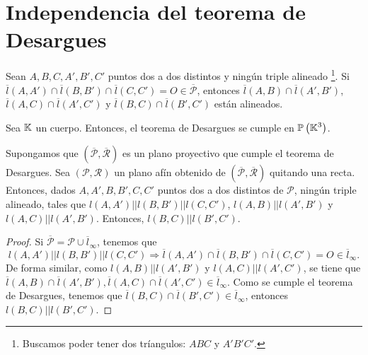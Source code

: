 \section{Independencia del teorema de Desargues}
\begin{theorem}
Sean $\displaystyle A,B,C,A', B', C' $ puntos dos a dos distintos y ningún triple alineado \footnote{Buscamos poder tener dos tríangulos: $\displaystyle ABC $ y $\displaystyle A'B'C' $.}. Si $\displaystyle \overline{l}\left(A,A'\right) \cap \overline{l}\left(B,B'\right)\cap \overline{l}\left(C,C'\right) = O \in \overline{\mathcal{P}} $, entonces $\displaystyle \overline{l}\left(A,B\right) \cap \overline{l}\left(A',B'\right) $, $\displaystyle \overline{l}\left(A,C\right) \cap \overline{l}\left(A',C'\right) $ y $\displaystyle \overline{l}\left(B,C\right) \cap \overline{l}\left(B',C'\right) $ están alineados.
\end{theorem}
\begin{theorem}
Sea $\displaystyle \mathbb{K} $ un cuerpo. Entonces, el teorema de Desargues se cumple en $\displaystyle \mathbb{P}\left(\mathbb{K}^{3}\right) $.
\end{theorem}
\begin{prop}
Supongamos que $\displaystyle \left(\overline{\mathcal{P}}, \overline{\mathcal{R}}\right) $ es un plano proyectivo que cumple el teorema de Desargues. Sea $\displaystyle \left(\mathcal{P}, \mathcal{R}\right) $ un plano afín obtenido de $\displaystyle \left(\overline{\mathcal{P}}, \overline{\mathcal{R}}\right) $ quitando una recta. Entonces, dados $\displaystyle A,A',B,B',C,C'  $ puntos dos a dos distintos de $\displaystyle \mathcal{P} $, ningún triple alineado, tales que $\displaystyle l\left(A,A'\right) | | l\left(B, B'\right) | | l\left(C,C'\right) $, $\displaystyle l\left(A,B\right) | | l\left(A',B'\right) $ y $\displaystyle l\left(A,C\right) | | l\left(A',B'\right) $. Entonces, $\displaystyle l\left(B,C\right) | | l\left(B',C'\right) $.
\end{prop}
\begin{proof}
Si $\displaystyle \overline{\mathcal{P}} = \mathcal{P} \cup \overline{l}_{\infty} $, tenemos que 
\[l\left(A,A'\right) | | l\left(B,B'\right) | | l\left(C,C'\right) \Rightarrow \overline{l}\left(A,A'\right) \cap \overline{l}\left(B,B'\right) \cap \overline{l}\left(C,C'\right) = O \in \overline{l}_{\infty} .\]
De forma similar, como $\displaystyle l\left(A,B\right) | | l\left(A', B'\right) $ y $\displaystyle l\left(A,C\right) | | l\left(A',C'\right) $, se tiene que $\displaystyle \overline{l}\left(A,B\right) \cap \overline{l}\left(A',B'\right), \overline{l}\left(A,C\right)\cap \overline{l}\left(A',C'\right) \in \overline{l}_{\infty} $. Como se cumple el teorema de Desargues, tenemos que $\displaystyle \overline{l}\left(B,C\right) \cap \overline{l}\left(B',C'\right) \in \overline{l}_{\infty} $, entonces $\displaystyle l\left(B,C\right) | | l\left(B',C'\right) $.
\end{proof}
